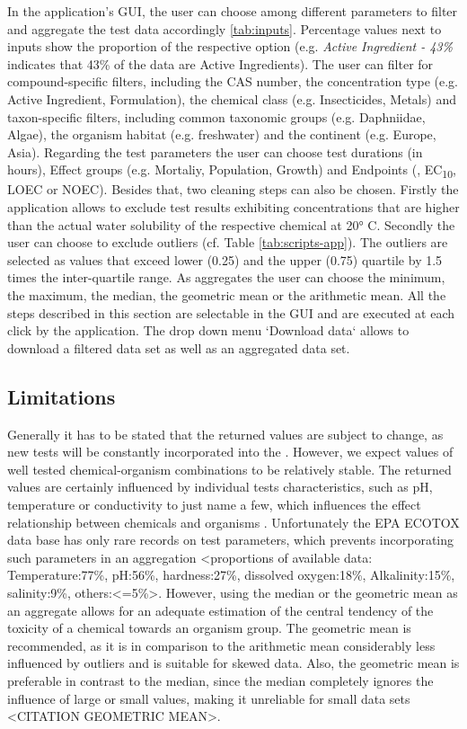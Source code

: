 In the application's GUI, the user can choose among different parameters to filter and aggregate the test data accordingly \ref{tab:inputs}. Percentage values next to inputs show the proportion of the respective option (e.g. \textit{Active Ingredient - 43\%} indicates that 43\% of the data are Active Ingredients). The user can filter for compound-specific filters, including the CAS number, the concentration type (e.g. Active Ingredient, Formulation), the chemical class (e.g. Insecticides, Metals) and taxon-specific filters, including common taxonomic groups (e.g. Daphniidae, Algae), the organism habitat (e.g. freshwater) and the continent (e.g. Europe, Asia). Regarding the test parameters the user can choose test durations (in hours), Effect groups (e.g. Mortaliy, Population, Growth) and Endpoints (\ecfifty, EC\textsubscript{10}, LOEC or NOEC). Besides that, two cleaning steps can also be chosen. Firstly the application allows to exclude test results exhibiting concentrations that are higher than the actual water solubility of the respective chemical at \ang{20} C. Secondly the user can choose to exclude outliers (cf. Table \ref{tab:scripts-app}). The outliers are selected as values that exceed lower (0.25) and the upper (0.75) quartile by 1.5 times the inter-quartile range. As aggregates the user can choose the minimum, the maximum, the median, the geometric mean or the arithmetic mean. All the steps described in this section are selectable in the GUI and are executed at each click by the application. The drop down menu `Download data` allows to download a filtered data set as well as an aggregated data set.

\subsection*{Limitations}

Generally it has to be stated that the returned values are subject to change, as new tests will be constantly incorporated into the \etoxbase{}. However, we expect values of well tested chemical-organism combinations to be relatively stable. The returned values are certainly influenced by individual tests characteristics, such as pH, temperature or conductivity to just name a few, which influences the effect relationship between chemicals and organisms \citep{rosenkrantz_influence_2013,li_temperature_2011}. Unfortunately the EPA ECOTOX data base has only rare records on test parameters, which prevents incorporating such parameters in an aggregation <proportions of available data: Temperature:77\%, pH:56\%, hardness:27\%, dissolved oxygen:18\%, Alkalinity:15\%, salinity:9\%, others:<=5\%>. However, using the median or the geometric mean as an aggregate allows for an adequate estimation of the central tendency of the toxicity of a chemical towards an organism group. The geometric mean is recommended, as it is in comparison to the arithmetic mean considerably less influenced by outliers and is suitable for skewed data. Also, the geometric mean is preferable in contrast to the median, since the median completely ignores the influence of large or small values, making it unreliable for small data sets <CITATION GEOMETRIC MEAN>.

